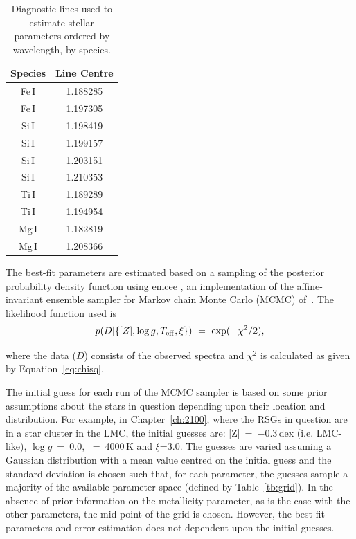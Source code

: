 \begin{table}
\caption[Diagnostic lines]{Diagnostic lines used to estimate stellar parameters ordered by wavelength, by species.\label{tb:lines}}
\scriptsize
\begin{center}
\begin{tabular}{cc}
 \hline
 \hline
Species & Line Centre \\
 \hline
Fe\,I & 1.188285 \\
Fe\,I & 1.197305 \\
Si\,I & 1.198419 \\
Si\,I & 1.199157 \\
Si\,I & 1.203151 \\
Si\,I & 1.210353 \\
Ti\,I & 1.189289 \\
Ti\,I & 1.194954 \\
Mg\,I & 1.182819\\
Mg\,I & 1.208366\\
 \hline
\end{tabular}
\end{center}
\end{table}

The best-fit parameters are estimated based on a sampling of the posterior probability density function using emcee
\cite{2013PASP..125..306F},
an implementation of the affine-invariant ensemble sampler for Markov chain Monte Carlo (MCMC) of~\cite{2010CAMCS.5..65G}.
The likelihood function used is
\begin{equation}
    p(D|\{[Z], \log g, T_{\rm eff}, \xi\})~=~\exp(-\chi^{2}/2), \label{eq:like}
\end{equation}

\noinent where the data ($D$) consists of the observed spectra and $\chi^{2}$ is calculated as given by Equation~\ref{eq:chisq}.

The initial guess for each run of the MCMC sampler is based on some prior assumptions about the stars in question depending upon their location and distribution.
For example, in Chapter~\ref{ch:2100}, where the RSGs in question are in a star cluster in the LMC, the initial guesses are: [Z]~=~$-$0.3\,dex (i.e. LMC-like), $\log g$~=~0.0, \Teff~=~4000\,K and $\xi$=3.0.
The guesses are varied assuming a Gaussian distribution with a mean value centred on the initial guess and the standard deviation is chosen such that, for each parameter, the guesses sample a majority of the available parameter space (defined by Table~\ref{tb:grid}).
In the absence of prior information on the metallicity parameter, as is the case with the other parameters, the mid-point of the grid is chosen.
However, the best fit parameters and error estimation does not dependent upon the initial guesses.

